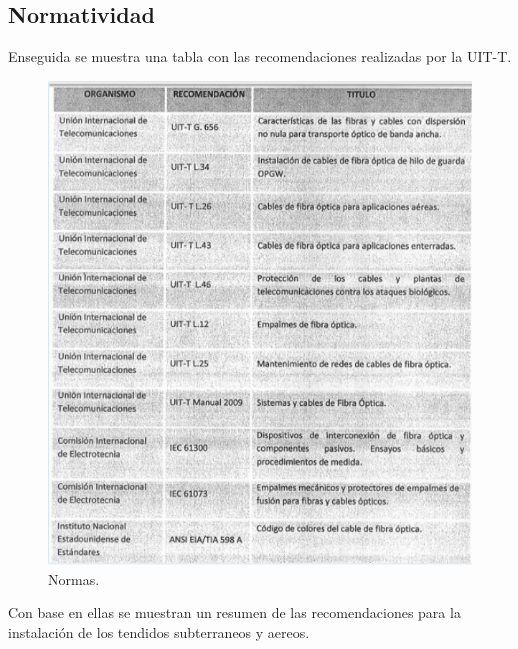 \documentclass[12pt,letterpaper]{article}
\begin{document}
\subsection{Normatividad}
Enseguida se muestra una tabla con las recomendaciones realizadas por la UIT-T.
\begin{figure}[ht]
    \centering
    \includegraphics[width=.7\textwidth]{imagenes/norm.PNG}
    \caption{Normas.}
\end{figure}

Con base en ellas se muestran un resumen de las recomendaciones para la instalación 
de los tendidos subterraneos y aereos.
\end{document}
